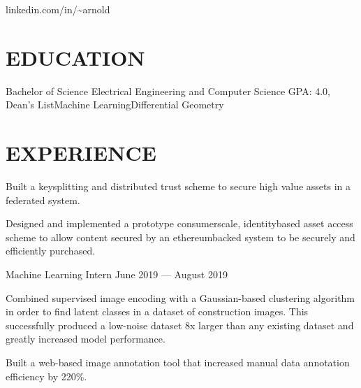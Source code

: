 \documentclass[10pt]{article}
\begin{document}
				 {linkedin.com/in/{\textasciitilde}arnold}      

\section*{EDUCATION}

    {Bachelor of Science {\textendash} Electrical Engineering and Computer Science}
{GPA: 4.0, Dean's List}{Machine Learning}{Differential Geometry}


\section*{EXPERIENCE}


                  \begin{accomplishments}
                \item Built a key{\textendash}splitting and distributed trust scheme to secure high value assets in a federated system.
                \item Designed and implemented a prototype consumer{\textendash}scale, identity{\textendash}based asset access scheme to allow content secured by an ethereum{\textendash}backed system to be securely and efficiently purchased. 
                  \end{accomplishments}

                {Machine Learning Intern}
                {June 2019 --- August 2019}
                    \begin{accomplishments}
                        \item Combined supervised image encoding with a Gaussian-based clustering algorithm in order to find latent classes in a dataset of construction images. 
                          This successfully produced a low-noise dataset 8x larger than any existing dataset and greatly increased model performance.
                        \item Built a web-based image annotation tool that increased manual data annotation efficiency by 220\%.
                    \end{accomplishments}
\end{document}
